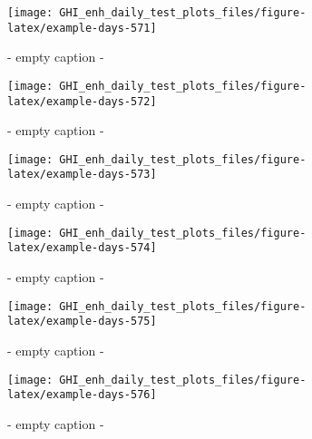 \documentclass[
  10pt,
  a4paper,oneside]{article}
\begin{document}
\begin{figure}[H]

{\centering \texttt{[image: GHI\_enh\_daily\_test\_plots\_files/figure-latex/example-days-571]} 

}

\caption{ - empty caption - }\label{fig:example-days-571}
\end{figure}

\begin{figure}[H]

{\centering \texttt{[image: GHI\_enh\_daily\_test\_plots\_files/figure-latex/example-days-572]} 

}

\caption{ - empty caption - }\label{fig:example-days-572}
\end{figure}

\begin{figure}[H]

{\centering \texttt{[image: GHI\_enh\_daily\_test\_plots\_files/figure-latex/example-days-573]} 

}

\caption{ - empty caption - }\label{fig:example-days-573}
\end{figure}

\begin{figure}[H]

{\centering \texttt{[image: GHI\_enh\_daily\_test\_plots\_files/figure-latex/example-days-574]} 

}

\caption{ - empty caption - }\label{fig:example-days-574}
\end{figure}

\begin{figure}[H]

{\centering \texttt{[image: GHI\_enh\_daily\_test\_plots\_files/figure-latex/example-days-575]} 

}

\caption{ - empty caption - }\label{fig:example-days-575}
\end{figure}

\begin{figure}[H]

{\centering \texttt{[image: GHI\_enh\_daily\_test\_plots\_files/figure-latex/example-days-576]} 

}

\caption{ - empty caption - }\label{fig:example-days-576}
\end{figure}
\end{document}
